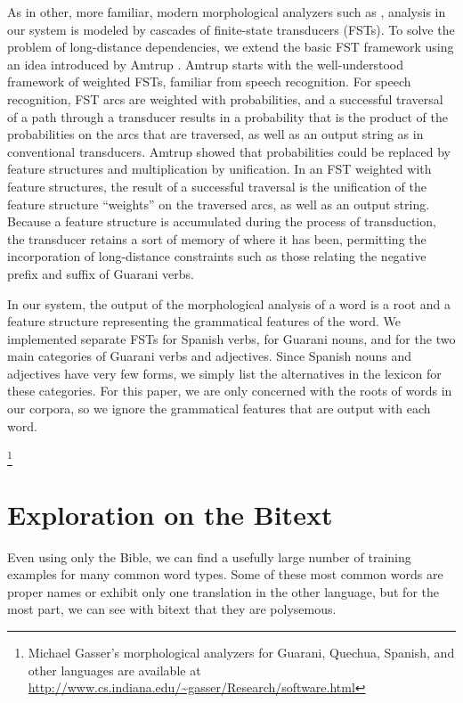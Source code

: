 As in other, more familiar, modern
morphological analyzers such as \cite{beesley+karttunen}, analysis in our
system is modeled by cascades of finite-state transducers (FSTs).  To solve the
problem of long-distance dependencies, we extend the basic FST framework using
an idea introduced by Amtrup \cite{amtrup:03}.  Amtrup starts with the
well-understood framework of weighted FSTs, familiar from speech recognition.
For speech recognition, FST arcs are weighted with probabilities, and a
successful traversal of a path through a transducer results in a probability
that is the product of the probabilities on the arcs that are traversed, as
well as an output string as in conventional transducers.  Amtrup showed that
probabilities could be replaced by feature structures and multiplication by
unification.  In an FST weighted with feature structures, the result of a
successful traversal is the unification of the feature structure ``weights'' on
the traversed arcs, as well as an output string.  Because a feature structure
is accumulated during the process of transduction, the transducer retains a
sort of memory of where it has been, permitting the incorporation of
long-distance constraints such as those relating the negative prefix and suffix
of Guarani verbs.

In our system, the output of the morphological analysis of a word is a root and
a feature structure representing the grammatical features of the word.  We
implemented separate FSTs for Spanish verbs, for Guarani nouns, and for the two
main categories of Guarani verbs and adjectives.  Since Spanish nouns and
adjectives have very few forms, we simply list the alternatives in the lexicon
for these categories.  For this paper, we are only concerned with the roots of
words in our corpora, so we ignore the grammatical features that are output
with each word.

\footnote{Michael Gasser's morphological analyzers for Guarani, Quechua,
Spanish, and other languages are available at
\url{http://www.cs.indiana.edu/~gasser/Research/software.html} }


\section{Exploration on the Bitext}
Even using only the Bible, we can find a usefully large number of training
examples for many common word types. Some of these most common words are proper
names or exhibit only one translation in the other language, but for the most
part, we can see with bitext that they are polysemous.

